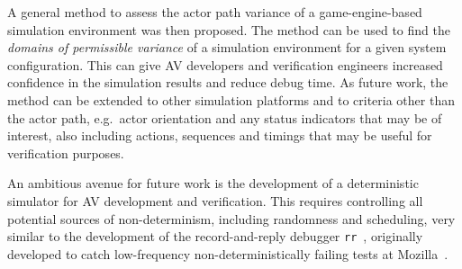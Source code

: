 A general method to assess the actor path variance of a game-engine-based simulation environment was then proposed. The method can be used to find the \textit{domains of permissible variance} of a simulation environment for a given system configuration. This can give AV developers and verification engineers increased confidence in the simulation results and reduce debug time. As future work, the method can be extended to other simulation platforms and to criteria other than the actor path, e.g.\ actor orientation and any status indicators that may be of interest, also including actions, sequences and timings that may be useful for verification purposes.

An ambitious avenue for future work is the development of a deterministic simulator for AV development and verification. This requires controlling all potential sources of non-determinism, including randomness and scheduling, very similar to the development of the record-and-reply debugger \texttt{rr}~\cite{RR_link}, originally developed to catch low-frequency non-deterministically failing tests at Mozilla~\cite{acm-q-rr-interview}.